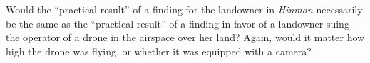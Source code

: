 \item Would the ``practical result'' of a finding for the landowner in
\textit{Hinman} necessarily be the same as the ``practical result'' of a
finding in favor of a landowner suing the operator of a drone in the airspace
over her land? Again, would it matter how high the drone was flying, or whether
it was equipped with a camera?


